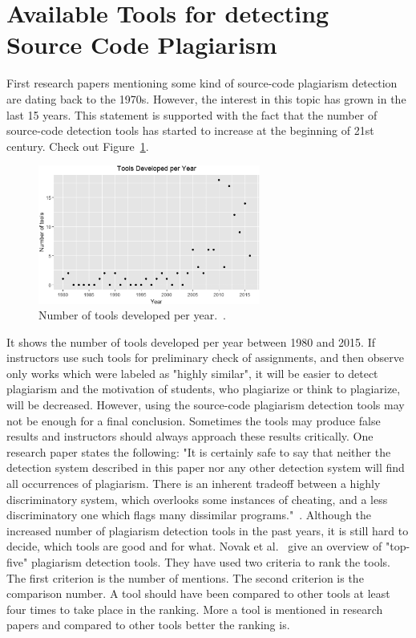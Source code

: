 \documentclass[12pt]{article}
\begin{document}
\section{Available Tools for detecting Source Code Plagiarism}\label{sec:Available Tools for detecting Source Code Plagiarism}


First research papers mentioning some kind of source-code plagiarism detection are dating back to the 1970s. However, the interest in this topic has grown in the last 15 years. This statement is supported with the fact that the number of source-code detection tools has started to increase at the beginning of 21st century. Check out Figure~\ref{fig:toolsNumber}. 

\begin{figure} [ht]
    \centering
    \includegraphics[width=0.65\textwidth]{../images/ToolsNumber.png}
    \caption{Number of tools developed per year.~\cite{novak}.}
    \label{fig:toolsNumber}
\end{figure}

It shows the number of tools developed per year between 1980 and 2015. If instructors use such tools for preliminary check of assignments, and then observe only works which were labeled as "highly similar", it will be easier to detect plagiarism and the motivation of students, who plagiarize or think to plagiarize, will be decreased. However, using the source-code plagiarism detection tools may not be enough for a final conclusion. Sometimes the tools may produce false results and instructors should always approach these results critically. One research paper states the following: "It is certainly safe to say that neither the detection system described in this paper nor any other detection system will find all occurrences of plagiarism. There is an inherent tradeoff between a highly discriminatory system, which overlooks some instances of cheating, and a less discriminatory one which flags many dissimilar programs."~\cite{donaldson}. Although the increased number of plagiarism detection tools in the past years, it is still hard to decide, which tools are good and for what. Novak et al.~\cite{novak} give an overview of "top-five" plagiarism detection tools. They have used two criteria to rank the tools. The first criterion is the number of mentions. The second criterion is the comparison number. A tool should have been compared to other tools at least four times to take place in the ranking. More a tool is mentioned in research papers and compared to other tools better the ranking is. 
\end{document}
